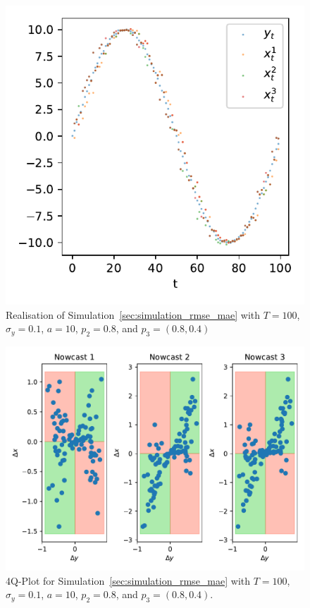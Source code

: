 \documentclass[oneside]{article}
\theoremstyle{plain}%
\theoremstyle{definition}
\begin{document}
\begin{figure}
  \centering
  \includegraphics{plots/simulation_same_rmse_mae/time_series.pdf}
  \caption{Realisation of Simulation~\ref{sec:simulation_rmse_mae} with $T = 100$, $\sigma_y=0.1$, $a = 10$, $p_2 = 0.8$, and $p_3 = (0.8, 0.4)$}
  \label{fig:simulation_rmse_mae_ts}
\end{figure}

\begin{figure}
  \centering
  \includegraphics{plots/simulation_same_rmse_mae/4q_plot.pdf}
  \caption{4Q-Plot for Simulation~\ref{sec:simulation_rmse_mae} with $T = 100$, $\sigma_y=0.1$, $a = 10$, $p_2 = 0.8$, and $p_3 = (0.8, 0.4)$.}
  \label{fig:simulation_rmse_mae_4q}
\end{figure}
\end{document}

